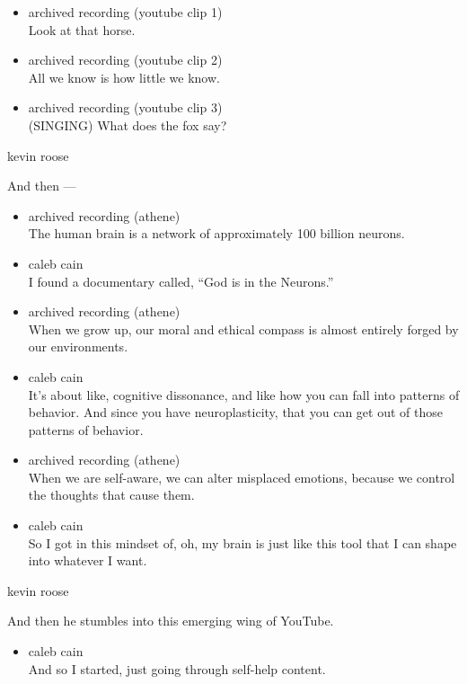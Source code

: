 \begin{itemize}
\item
  archived recording (youtube clip 1)\\
  Look at that horse.
\item
  archived recording (youtube clip 2)\\
  All we know is how little we know.
\item
  archived recording (youtube clip 3)\\
  (SINGING) What does the fox say?
\end{itemize}

kevin roose

And then ---

\begin{itemize}
\item
  archived recording (athene)\\
  The human brain is a network of approximately 100 billion neurons.
\item
  caleb cain\\
  I found a documentary called, ``God is in the Neurons.''
\item
  archived recording (athene)\\
  When we grow up, our moral and ethical compass is almost entirely
  forged by our environments.
\item
  caleb cain\\
  It's about like, cognitive dissonance, and like how you can fall into
  patterns of behavior. And since you have neuroplasticity, that you can
  get out of those patterns of behavior.
\item
  archived recording (athene)\\
  When we are self-aware, we can alter misplaced emotions, because we
  control the thoughts that cause them.
\item
  caleb cain\\
  So I got in this mindset of, oh, my brain is just like this tool that
  I can shape into whatever I want.
\end{itemize}

kevin roose

And then he stumbles into this emerging wing of YouTube.

\begin{itemize}
\tightlist
\item
  caleb cain\\
  And so I started, just going through self-help content.
\end{itemize}

